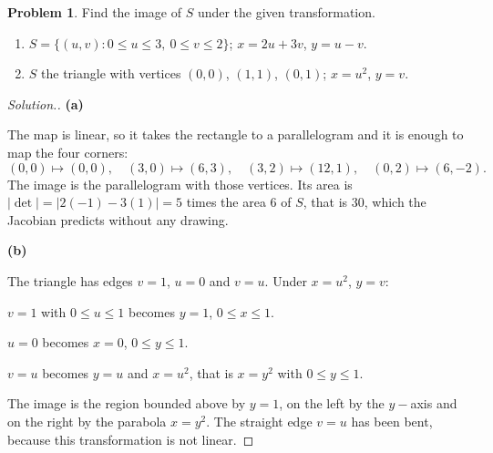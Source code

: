 \documentclass[11pt,a4paper]{article}
\theoremstyle{definition}
\newtheorem{problemx}{Problem}[subsection]
\newenvironment{problem}{\begin{problemx}}{\end{problemx}}
\newenvironment{solution}
  {\renewcommand{\qedsymbol}{}\begin{proof}[\textit{Solution}.]}
  {\end{proof}}
\newcommand{\subhead}[1]{%
  \par\medskip\noindent\textbf{#1}\par\nobreak\smallskip}
\begin{document}
\begin{problem}
Find the image of $S$ under the given transformation.
\begin{enumerate}
\item[(a)] $S = \{(u,v): 0\leq u\leq 3,\ 0\leq v\leq 2\}$;
$x = 2u+3v$, $y = u-v$.
\item[(b)] $S$ the triangle with vertices $(0,0)$, $(1,1)$, $(0,1)$;
$x = u^2$, $y = v$.
\end{enumerate}
\end{problem}
\begin{solution}
\subhead{(a)}
The map is linear, so it takes the rectangle to a parallelogram and it is enough
to map the four corners:
\[(0,0)\mapsto(0,0),\quad (3,0)\mapsto(6,3),\quad
(3,2)\mapsto(12,1),\quad (0,2)\mapsto(6,-2).\]
The image is the parallelogram with those vertices. Its area is
$\left|\det\right| = \left|2(-1)-3(1)\right| = 5$ times the area $6$ of $S$,
that is $30$, which the Jacobian predicts without any drawing.

\subhead{(b)}
The triangle has edges $v=1$, $u=0$ and $v=u$. Under $x = u^2$, $y = v$:

$v=1$ with $0\leq u\leq 1$ becomes $y=1$, $0\leq x\leq 1$.

$u=0$ becomes $x=0$, $0\leq y\leq 1$.

$v=u$ becomes $y = u$ and $x = u^2$, that is $x = y^2$ with $0\leq y\leq 1$.

The image is the region bounded above by $y=1$, on the left by the $y-$axis and
on the right by the parabola $x = y^2$. The straight edge $v=u$ has been bent,
because this transformation is not linear.
\end{solution}
\end{document}
